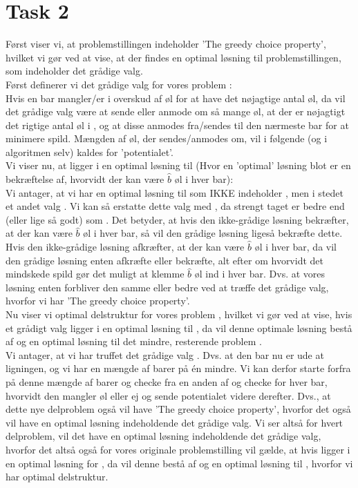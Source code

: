 \section{Task 2}

Først viser vi, at problemstillingen indeholder 'The greedy choice property', hvilket vi gør ved at vise, at der findes en optimal løsning til problemstillingen, som indeholder det grådige valg.\\
Først definerer vi det grådige valg  for vores problem :\\
Hvis en bar  mangler/er i overskud af  øl for at have det nøjagtige antal øl, da vil det grådige valg være at sende eller anmode om så mange øl, at der er nøjagtigt det rigtige antal øl i , og at disse anmodes fra/sendes til den nærmeste bar for at minimere spild. Mængden af øl, der sendes/anmodes om, vil i følgende (og i algoritmen selv) kaldes for 'potentialet'.\\
Vi viser nu, at  ligger i en optimal løsning til  (Hvor en 'optimal' løsning blot er en bekræftelse af, hvorvidt der kan være $\hat{b}$ øl i hver bar):\\
Vi antager, at vi har en optimal løsning til  som IKKE indeholder , men i stedet et andet valg . Vi kan så erstatte dette valg  med , da  strengt taget er bedre end (eller lige så godt) som . Det betyder, at hvis den ikke-grådige løsning bekræfter, at der kan være $\hat{b}$ øl i hver bar, så vil den grådige løsning ligeså bekræfte dette. Hvis den ikke-grådige løsning afkræfter, at der kan være $\hat{b}$ øl i hver bar, da vil den grådige løsning enten afkræfte eller bekræfte, alt efter om hvorvidt det mindskede spild gør det muligt at klemme $\hat{b}$ øl ind i hver bar. Dvs. at vores løsning enten forbliver den samme eller bedre ved at træffe det grådige valg, hvorfor vi har 'The greedy choice property'.\\
Nu viser vi optimal delstruktur for vores problem , hvilket vi gør ved at vise, hvis et grådigt valg  ligger i en optimal løsning til , da vil denne optimale løsning bestå af  og en optimal løsning til det mindre, resterende problem .\\
Vi antager, at vi har truffet det grådige valg .
Dvs. at den bar nu er ude at ligningen, og vi har en mængde af barer på én mindre. Vi kan derfor starte forfra på denne mængde af barer og checke fra en anden af og checke for hver bar, hvorvidt den mangler øl eller ej og sende potentialet videre derefter. Dvs., at dette nye delproblem  også vil have 'The greedy choice property', hvorfor det også vil have en optimal løsning indeholdende det grådige valg. Vi ser altså for hvert delproblem, vil det have en optimal løsning indeholdende det grådige valg, hvorfor det altså også for vores originale problemstilling  vil gælde, at hvis  ligger i en optimal løsning for , da vil denne bestå af  og en optimal løsning til , hvorfor vi har optimal delstruktur.

